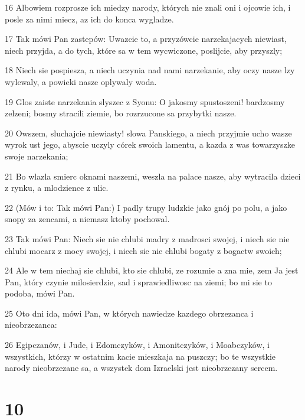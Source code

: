 \par 16 Albowiem rozprosze ich miedzy narody, których nie znali oni i ojcowie ich, i posle za nimi miecz, az ich do konca wygladze.
\par 17 Tak mówi Pan zastepów: Uwazcie to, a przyzówcie narzekajacych niewiast, niech przyjda, a do tych, które sa w tem wycwiczone, poslijcie, aby przyszly;
\par 18 Niech sie pospiesza, a niech uczynia nad nami narzekanie, aby oczy nasze lzy wylewaly, a powieki nasze oplywaly woda.
\par 19 Glos zaiste narzekania slyszec z Syonu: O jakosmy spustoszeni! bardzosmy zelzeni; bosmy stracili ziemie, bo rozrzucone sa przybytki nasze.
\par 20 Owszem, sluchajcie niewiasty! slowa Panskiego, a niech przyjmie ucho wasze wyrok ust jego, abyscie uczyly córek swoich lamentu, a kazda z was towarzyszke swoje narzekania;
\par 21 Bo wlazla smierc oknami naszemi, weszla na palace nasze, aby wytracila dzieci z rynku, a mlodzience z ulic.
\par 22 (Mów i to: Tak mówi Pan:) I padly trupy ludzkie jako gnój po polu, a jako snopy za zencami, a niemasz ktoby pochowal.
\par 23 Tak mówi Pan: Niech sie nie chlubi madry z madrosci swojej, i niech sie nie chlubi mocarz z mocy swojej, i niech sie nie chlubi bogaty z bogactw swoich;
\par 24 Ale w tem niechaj sie chlubi, kto sie chlubi, ze rozumie a zna mie, zem Ja jest Pan, który czynie milosierdzie, sad i sprawiedliwosc na ziemi; bo mi sie to podoba, mówi Pan.
\par 25 Oto dni ida, mówi Pan, w których nawiedze kazdego obrzezanca i nieobrzezanca:
\par 26 Egipczanów, i Jude, i Edomczyków, i Amonitczyków, i Moabczyków, i wszystkich, którzy w ostatnim kacie mieszkaja na puszczy; bo te wszystkie narody nieobrzezane sa, a wszystek dom Izraelski jest nieobrzezany sercem.

\chapter{10}

